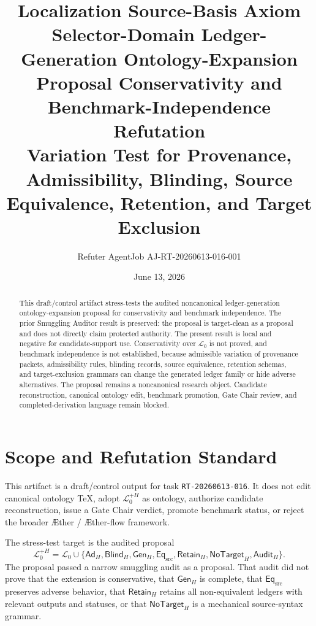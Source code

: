 \documentclass[11pt]{article}
\title{\textbf{Localization Source-Basis Axiom Selector-Domain Ledger-Generation Ontology-Expansion Proposal Conservativity and Benchmark-Independence Refutation}\\[0.35em]
\large Variation Test for Provenance, Admissibility, Blinding, Source Equivalence, Retention, and Target Exclusion}
\author{Refuter AgentJob AJ-RT-20260613-016-001}
\date{June 13, 2026}
\newcommand{\Aether}{\AE{}ther}
\newcommand{\Aflow}{\AE{}ther-flow}
\newcommand{\TheoryProgram}{\Aether{} / \Aflow{} framework}
\newcommand{\Lang}{\mathcal{L}_{0}}
\newcommand{\LangPlus}{\mathcal{L}_{0}^{+H}}
\newcommand{\AdH}{\mathsf{Ad}_{H}}
\newcommand{\BlindH}{\mathsf{Blind}_{H}}
\newcommand{\GenH}{\mathsf{Gen}_{H}}
\newcommand{\EqSrc}{\mathsf{Eq}_{\mathrm{src}}}
\newcommand{\RetainH}{\mathsf{Retain}_{H}}
\newcommand{\NoTargetH}{\mathsf{NoTarget}_{H}}
\newcommand{\AuditH}{\mathsf{Audit}_{H}}
\begin{document}
\maketitle

\begin{abstract}
This draft/control artifact stress-tests the audited noncanonical
ledger-generation ontology-expansion proposal for conservativity and
benchmark independence. The prior Smuggling Auditor result is preserved: the
proposal is target-clean as a proposal and does not directly claim protected
authority. The present result is local and negative for candidate-support
use. Conservativity over \(\Lang\) is not proved, and benchmark independence
is not established, because admissible variation of provenance packets,
admissibility rules, blinding records, source equivalence, retention schemas,
and target-exclusion grammars can change the generated ledger family or hide
adverse alternatives. The proposal remains a noncanonical research object.
Candidate reconstruction, canonical ontology edit, benchmark promotion, Gate
Chair review, and completed-derivation language remain blocked.
\end{abstract}

\section{Scope and Refutation Standard}

This artifact is a draft/control output for task \texttt{RT-20260613-016}.
It does not edit canonical ontology TeX, adopt \(\LangPlus\) as ontology,
authorize candidate reconstruction, issue a Gate Chair verdict, promote
benchmark status, or reject the broader \TheoryProgram{}.

The stress-test target is the audited proposal
\[
    \LangPlus =
    \Lang \cup
    \{\AdH,\BlindH,\GenH,\EqSrc,\RetainH,\NoTargetH,\AuditH\}.
\]
The proposal passed a narrow smuggling audit as a proposal. That audit did
not prove that the extension is conservative, that \(\GenH\) is complete,
that \(\EqSrc\) preserves adverse behavior, that \(\RetainH\) retains all
non-equivalent ledgers with relevant outputs and statuses, or that
\(\NoTargetH\) is a mechanical source-syntax grammar.
\end{document}
